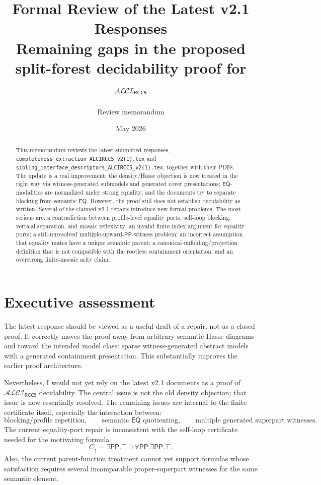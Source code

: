 \documentclass[11pt]{article}
\title{\textbf{Formal Review of the Latest v2.1 Responses}\\[0.35em]
\large Remaining gaps in the proposed split-forest decidability proof for $\ALCIRCC$}
\author{Review memorandum}
\date{May 2026}
\newcommand{\PP}{\mathsf{PP}}
\newcommand{\EQ}{\mathsf{EQ}}
\newcommand{\ALCIRCC}{\mathcal{ALCI}_{\mathsf{RCC5}}}
\begin{document}
\maketitle

\begin{abstract}
This memorandum reviews the latest submitted responses,
\texttt{completeness\_extraction\_ALCIRCC5\_v2(1).tex} and
\texttt{sibling\_interface\_descriptors\_ALCIRCC5\_v2(1).tex}, together
with their PDFs.  The update is a real improvement: the density/Hasse
objection is now treated in the right way via witness-generated submodels
and generated cover presentations; $\EQ$-modalities are normalized under
strong equality; and the documents try to separate blocking from semantic
$\EQ$.  However, the proof still does not establish decidability as written.
Several of the claimed v2.1 repairs introduce new formal problems.  The most
serious are: a contradiction between profile-level equality ports, self-loop
blocking, vertical separation, and mosaic reflexivity; an invalid finite-index
argument for equality ports; a still-unresolved multiple-upward-$\PP$-witness
problem; an incorrect assumption that equality mates have a unique semantic
parent; a canonical-unfolding/projection definition that is not compatible
with the rootless containment orientation; and an overstrong finite-mosaic
arity claim.
\end{abstract}

\section{Executive assessment}

The latest response should be viewed as a useful draft of a repair, not as a
closed proof.  It correctly moves the proof away from arbitrary semantic Hasse
diagrams and toward the intended model class: sparse witness-generated abstract
models with a generated containment presentation.  This substantially improves
the earlier proof architecture.

Nevertheless, I would not yet rely on the latest v2.1 documents as a proof of
\(\ALCIRCC\) decidability.  The central issue is not the old density objection;
that issue is now essentially resolved.  The remaining issues are internal to
the finite certificate itself, especially the interaction between:
\[
\text{blocking/profile repetition},\qquad
\text{semantic }\EQ\text{ quotienting},\qquad
\text{multiple generated superpart witnesses}.
\]
The current equality-port repair is inconsistent with the self-loop certificate
needed for the motivating formula
\[
C_\uparrow = \exists\PP.\top \sqcap \forall\PP.\exists\PP.\top.
\]
Also, the current parent-function treatment cannot yet support formulas whose
satisfaction requires several incomparable proper-superpart witnesses for the
same semantic element.
\end{document}
